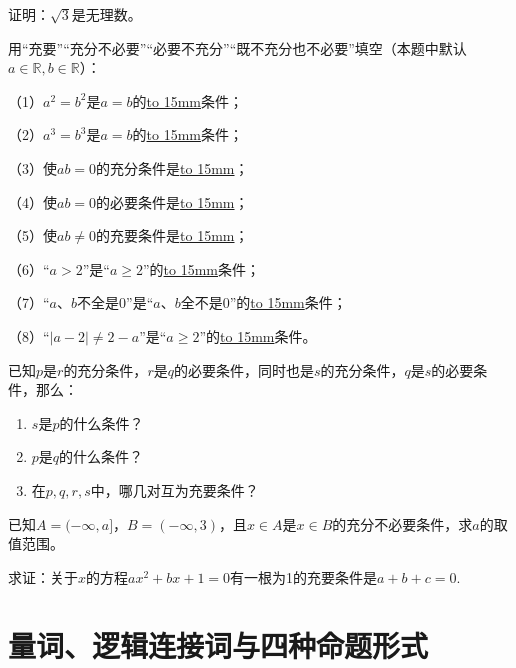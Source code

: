 \documentclass[lang=cn,math=cm,chinesefont=nofont,11pt,scheme=chinese,twocol]{elegantbook}
\begin{document}
\begin{exercise}\label{202407081520}
  证明：$\sqrt{3}$是无理数。
\end{exercise}

\begin{exercise}\label{BJ4Z_Algebra1_P28.2}
  用“充要”“充分不必要”“必要不充分”“既不充分也不必要”填空（本题中默认$a\in\mathbb{R},b\in\mathbb{R}$）：

  （1）$a^2=b^2$是$a=b$的\underline{\hbox to 15mm{}}条件；

  （2）$a^3=b^3$是$a=b$的\underline{\hbox to 15mm{}}条件；

  （3）使$ab=0$的充分条件是\underline{\hbox to 15mm{}}；

  （4）使$ab=0$的必要条件是\underline{\hbox to 15mm{}}；

  （5）使$ab\neq 0$的充要条件是\underline{\hbox to 15mm{}}；

  （6）“$a>2$”是“$a\geqslant2$”的\underline{\hbox to 15mm{}}条件；

  （7）“$a、b$不全是0”是“$a、b$全不是0”的\underline{\hbox to 15mm{}}条件；

  （8）“$\vert a-2\vert\neq2-a$”是“$a\geqslant2$”的\underline{\hbox to 15mm{}}条件。
\end{exercise}

\begin{exercise}\label{2017_XJ_bx1_P23.8}
  已知$p$是$r$的充分条件，$r$是$q$的必要条件，同时也是$s$的充分条件，$q$是$s$的必要条件，那么：
\end{exercise}

\begin{enumerate}
  \item $s$是$p$的什么条件？
  \item $p$是$q$的什么条件？
  \item 在$p,q,r,s$中，哪几对互为充要条件？
\end{enumerate}

\begin{exercise}\label{2017_RJB_bx1_P36.B5}
  已知$A=(-\infty,a]$，$B=(-\infty,3)$，且$x\in A$是$x\in B$的充分不必要条件，求$a$的取值范围。
\end{exercise}

\begin{exercise}\label{zhw2000_g1_P51.78}
  求证：关于$x$的方程$ax^2+bx+1=0$有一根为1的充要条件是$a+b+c=0$.
\end{exercise}

\section{量词、逻辑连接词与四种命题形式}
\end{document}
